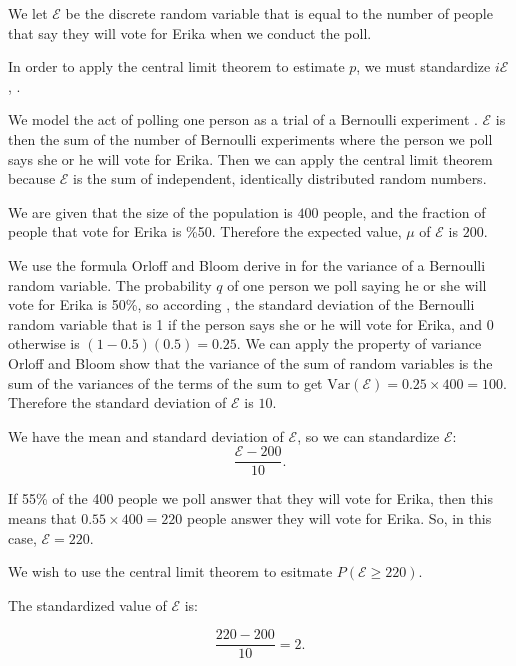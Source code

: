 \documentclass[a4paper,11pt]{article}
\begin{document}
We let $\mathcal{E}$ be the discrete random variable that is equal to the
number of people that say they will vote for Erika when we conduct the poll.

In order to apply the central limit theorem to estimate $p$, we must standardize
$i\mathcal{E}$ \cite{reading6b}, \cite{slides6Sol}.

We model the act of polling one person as a trial of a Bernoulli experiment
\cite{reading6b}. $\mathcal{E}$ is then the sum of the number of Bernoulli
experiments where the person we poll says she or he will vote for Erika.
Then we can apply the central limit theorem because $\mathcal{E}$ is the
sum of independent, identically distributed random numbers.

We are given that the size of the population is $400$ people, and the fraction of
people that vote for Erika is \%50.  Therefore the expected  value, $\mu$ of
$\mathcal{E}$ is $200$.

We use the formula Orloff and Bloom derive in \cite{reading5a} for the
variance of a Bernoulli random variable.  The probability $q$ of one
person we poll saying he or she will vote for Erika is 50\%, so according
\cite{reading5a}, the standard deviation of the Bernoulli random
variable that is 1 if the person says she or he will vote for Erika, and 0
otherwise is $\left(1-0.5 \right) \left(0.5 \right) = 0.25$.  We can
apply the property of variance Orloff and Bloom show \cite{reading5a} that
the variance of the sum of random variables is the sum of the variances of
the terms of the sum to get $\text{Var}\left( \mathcal{E} \right)=0.25 \times 400=100$.
Therefore the standard deviation of $\mathcal{E}$ is $10$.

We have the mean and standard deviation of $\mathcal{E}$, so we can
standardize $\mathcal{E}$:
\begin{equation}
   \frac{\mathcal{E} - 200}{10}.
\end{equation}

If 55\% of the 400 people we poll answer that they will vote for Erika,
then this means that $0.55 \times 400 = 220$ people answer they
will vote for Erika.  So, in this case, $\mathcal{E}=220$.

We wish to use the central limit theorem to esitmate
$P\left( \mathcal{E} \geq 220 \right)$.

The standardized value of $\mathcal{E}$ is:

\begin{equation}
   \frac{220 - 200}{10} = 2.
\end{equation}
\end{document}
